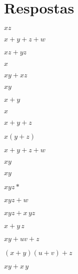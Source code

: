 \vfill
\footnotesize
\section*{Respostas}

\setcounter{exno}{0}
\exercise
\begin{enumerate}[a)]
\begin{minipage}{.5\textwidth}
\item $x\!z$
\item $\!x + \!y + \!z + \!w$
\item $\!xz + yz$
\item $x$
\end{minipage}
\begin{minipage}{.5\textwidth}
\item $xy + xz$
\item $xy$
\item $x + y$
\item $x$
\end{minipage}
\end{enumerate}

\exercise
\begin{enumerate}[a)]
\begin{minipage}{.5\textwidth}
\item $\!x + \!y + z $
\item $\!x(y + \!z)$ 
\item $\!x + \!y + z + w $
\item $\!x y$
\item $xy$
\item $xyz *$
\end{minipage}
\begin{minipage}{.5\textwidth}
\item $xyz + \!w$
\item $xyz + \!x\,\!yz$
\item $\!x + \!y\,\!z $
\item $xy + uv + \!z $
\item $ (\!x + \!y)(\!u + \!v) + \!z $
\item $ xy + \!x\,\!y$
\end{minipage}
\end{enumerate}
